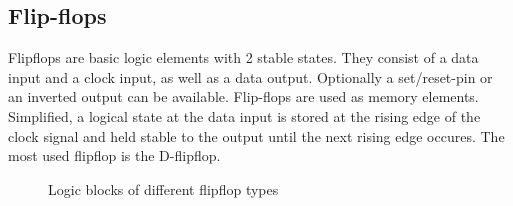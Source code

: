 \subsection{Flip-flops}
\label{ch:flipflops}
Flipflops are basic logic elements with 2 stable states. They consist of a data input and a clock input, as well as a data output. Optionally a set/reset-pin or an inverted output can be available. Flip-flops are used as memory elements. Simplified, a logical state at the data input is stored at the rising edge of the clock signal and held stable to the output until the next rising edge occures. The most used flipflop is the D-flipflop.
\begin{figure}
\begin{center}
\caption{Logic blocks of different flipflop types}
\end{center}
\end{figure}

